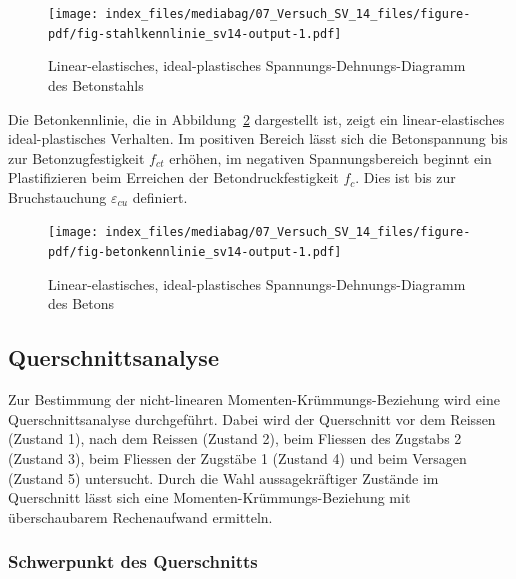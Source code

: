 \documentclass[
  12pt,
  letterpaper,
  egregdoesnotlikesansseriftitles]{scrreprt}
\begin{document}
\begin{figure}[H]

{\centering \texttt{[image: index\_files/mediabag/07\_Versuch\_SV\_14\_files/figure-pdf/fig-stahlkennlinie\_sv14-output-1.pdf]}

}

\caption{\label{fig-stahlkennlinie_sv14}Linear-elastisches,
ideal-plastisches Spannungs-Dehnungs-Diagramm des Betonstahls}

\end{figure}

Die Betonkennlinie, die in Abbildung~\ref{fig-betonkennlinie_sv14}
dargestellt ist, zeigt ein linear-elastisches ideal-plastisches
Verhalten. Im positiven Bereich lässt sich die Betonspannung bis zur
Betonzugfestigkeit \(f_{ct}\) erhöhen, im negativen Spannungsbereich
beginnt ein Plastifizieren beim Erreichen der Betondruckfestigkeit
\(f_c\). Dies ist bis zur Bruchstauchung \(\varepsilon_{cu}\) definiert.

\begin{figure}[H]

{\centering \texttt{[image: index\_files/mediabag/07\_Versuch\_SV\_14\_files/figure-pdf/fig-betonkennlinie\_sv14-output-1.pdf]}

}

\caption{\label{fig-betonkennlinie_sv14}Linear-elastisches,
ideal-plastisches Spannungs-Dehnungs-Diagramm des Betons}

\end{figure}

\hypertarget{querschnittsanalyse-1}{%
\subsection{Querschnittsanalyse}\label{querschnittsanalyse-1}}

Zur Bestimmung der nicht-linearen Momenten-Krümmungs-Beziehung wird eine
Querschnittsanalyse durchgeführt. Dabei wird der Querschnitt vor dem
Reissen (Zustand 1), nach dem Reissen (Zustand 2), beim Fliessen des
Zugstabs 2 (Zustand 3), beim Fliessen der Zugstäbe 1 (Zustand 4) und
beim Versagen (Zustand 5) untersucht. Durch die Wahl aussagekräftiger
Zustände im Querschnitt lässt sich eine Momenten-Krümmungs-Beziehung mit
überschaubarem Rechenaufwand ermitteln.

\hypertarget{schwerpunkt-des-querschnitts-1}{%
\subsubsection{Schwerpunkt des
Querschnitts}\label{schwerpunkt-des-querschnitts-1}}
\end{document}
